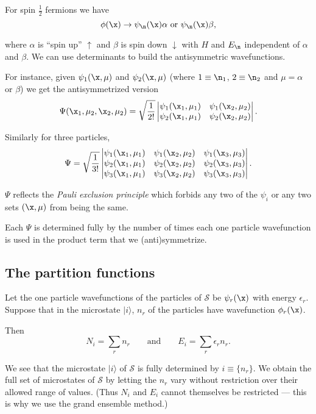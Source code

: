 \documentclass{notes}
\newcommand{\cS}{\mathcal{S}}
\newcommand{\ket}[1]{|#1\rangle}
\begin{document}
For spin $\tfrac{1}{2}$ fermions we have
\[
\phi(\x) \to \psi_\n(\x) \alpha \text{ or } \psi_\n(\x) \beta,
\]

where $\alpha$ is ``spin up'' $\uparrow$ and $\beta$ is spin down
$\downarrow$ with $H$ and $E_\n$ independent of $\alpha$ and $\beta$.
We can use determinants to build the antisymmetric wavefunctions.

For instance, given $\psi_1(\x,\mu)$ and $\psi_2(\x,\mu)$ (where
$1 \equiv \n_1$, $2 \equiv \n_2$ and $\mu = \alpha$ or $\beta$)
we get the antisymmetrized version
\[
\Psi(\x_1,\mu_2,\x_2,\mu_2)
= \sqrt{\frac{1}{2!}}\left|
\begin{matrix}
\psi_1(\x_1,\mu_1) & \psi_1(\x_2,\mu_2) \\
\psi_2(\x_1,\mu_1) & \psi_2(\x_2,\mu_2)
\end{matrix}
\right|.
\]

Similarly for three particles,
\[
\Psi = \sqrt{\frac{1}{3!}} \left|
\begin{matrix}
\psi_1(\x_1,\mu_1) & \psi_1(\x_2,\mu_2) & \psi_1(\x_3,\mu_3) \\
\psi_2(\x_1,\mu_1) & \psi_2(\x_2,\mu_2) & \psi_2(\x_3,\mu_3) \\
\psi_3(\x_1,\mu_1) & \psi_3(\x_2,\mu_2) & \psi_3(\x_3,\mu_3) \\
\end{matrix}
\right|.
\]

$\Psi$ reflects the \emph{Pauli exclusion principle} which forbids
any two of the $\psi_i$ or any two sets $(\x,\mu)$ from being the same.

Each $\Psi$ is determined fully by the number of times each one
particle wavefunction is used in the product term that we
(anti)symmetrize.

\subsection{The partition functions}

Let the one particle wavefunctions of the particles of $\cS$ be
$\psi_r(\x)$ with energy $\epsilon_r$.  Suppose that in the microstate
$\ket{i}$, $n_r$ of the particles have wavefunction $\phi_r(\x)$.

Then
\[
N_i = \sum_r n_r \qquad \text{and} \qquad E_i = \sum_r \epsilon_r n_r.
\]

We see that the microstate $\ket{i}$ of $\cS$ is fully determined by
$i \equiv \{ n_r \}$.  We obtain the full set of microstates of $\cS$
by letting the $n_r$ vary without restriction over their allowed range
of values.  (Thus $N_i$ and $E_i$ cannot themselves be restricted ---
this is why we use the grand ensemble method.)
\end{document}
